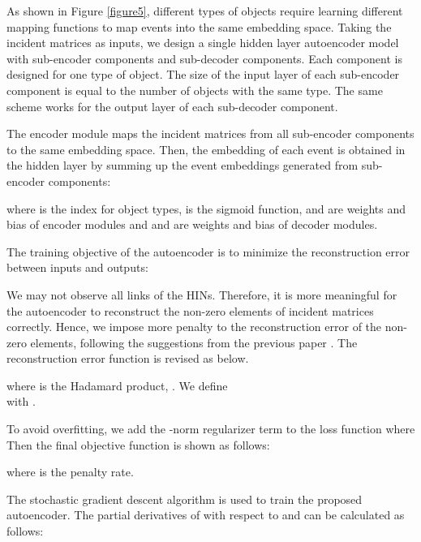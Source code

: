 As shown in Figure \ref{figure5}, different types of objects require learning different mapping functions to map events into the same embedding space. Taking the incident matrices  as inputs, we design a single hidden layer autoencoder model with  sub-encoder components and  sub-decoder components. Each component is designed for one type of object. The size of the input layer of each sub-encoder component is equal to the number of objects with the same type. The same scheme works for the output layer of each sub-decoder component.

The encoder module maps the incident matrices  from all sub-encoder components to the same embedding space. Then, the embedding of each event  is obtained in the hidden layer by summing up the event embeddings  generated from sub-encoder components:






\noindent where  is the index for object types,  is the sigmoid function,  and  are weights and bias of encoder modules and  and  are weights and bias of decoder modules.

\smallskip
The training objective of the autoencoder is to minimize the reconstruction error between inputs and outputs:



We may not observe all links of the HINs. Therefore, it is more meaningful for the autoencoder to reconstruct the non-zero elements of incident matrices correctly. Hence, we impose more penalty to the reconstruction error of the non-zero elements, following the suggestions from the previous paper \cite{wang2016structural}. The reconstruction error function is revised as below.



\noindent where  is the Hadamard product, . We define\\


\noindent with .

\smallskip
To avoid overfitting, we add the -norm regularizer term to the loss function  where \\


\noindent Then the final objective function is shown as follows:



\noindent where  is the penalty rate.
\smallskip

The stochastic gradient descent algorithm is used to train the proposed autoencoder. The partial derivatives of  with respect to  and  can be calculated as follows:


